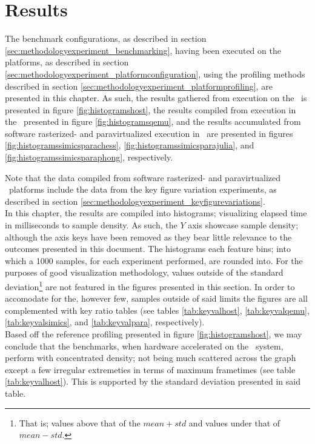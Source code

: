 
\chapter{Results}
\label{cha:results}
The benchmark configurations, as described in section \ref{sec:methodologyexperiment_benchmarking}, having been executed on the platforms, as described in section \ref{sec:methodologyexperiment_platformconfiguration}, using the profiling methods described in section \ref{sec:methodologyexperiment_platformprofiling}, are presented in this chapter.
As such, the results gathered from execution on the \dvttermhost\ is presented in figure \ref{fig:histogramshost}, the results compiled from execution in the \dvttermandroidemulator\ presented in figure \ref{fig:histogramsqemu}, and the results accumulated from software rasterized- and paravirtualized execution in \dvttermsimics\ are presented in figures \ref{fig:histogramssimicsparachess}, \ref{fig:histogramssimicsparajulia}, and \ref{fig:histogramssimicsparaphong}, respectively.

Note that the data compiled from software rasterized- and paravirtualized \dvttermsimics\ platforms include the data from the key figure variation experiments, as described in section \ref{sec:methodologyexperiment_keyfigurevariations}.\\

\noindent
In this chapter, the results are compiled into histograms; visualizing elapsed time in milliseconds to sample density.
As such, the $Y$ axis showcase sample density; although the axis keys have been removed as they bear little relevance to the outcomes presented in this document.
The histograms each feature  bins; into which a 1000 samples, for each experiment performed, are rounded into.
For the purposes of good visualization methodology, values outside of the standard deviation\footnote{That is; values above that of the $mean + std$ and values under that of $mean - std$.} are not featured in the figures presented in this section.
In order to accomodate for the, however few, samples outside of said limits the figures are all complemented with key ratio tables (see tables \ref{tab:keyvalhost}, \ref{tab:keyvalqemu}, \ref{tab:keyvalsimics}, and \ref{tab:keyvalpara}, respectively).\\

\noindent
Based off the reference profiling presented in figure \ref{fig:histogramshost}, we may conclude that the benchmarks, when hardware accelerated on the \dvttermhost\ system, perform with concentrated density; not being much scattered across the graph except a few irregular extremeties in terms of maximum frametimes (see table \ref{tab:keyvalhost}).
This is supported by the standard deviation presented in said table.

